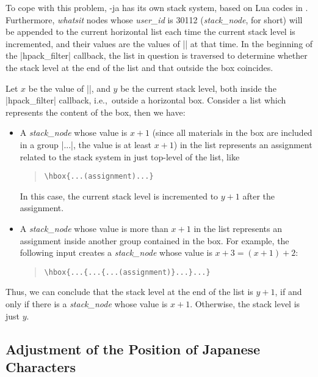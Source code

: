 \documentclass{ajt}
\begin{document}
To cope with this problem, \LuaTeX-ja has its own stack system, based on
Lua codes in \cite{stack-mail}. Furthermore, \emph{whatsit} nodes whose
\emph{user\_id} is 30112 (\emph{stack\_node}, for short) will be
appended to the current horizontal list each time the current stack
level is incremented, and their values are the values of
|\currentgrouplevel| at that time. In the beginning of the |hpack_filter|
callback, the list in question is traversed to determine whether the
stack level at the end of the list and that outside the box coincides.

Let $x$ be the value of |\currentgrouplevel|, and $y$ be the current
stack level, both inside the |hpack_filter| callback, i.e.,~outside a
horizontal box. Consider a list which represents the content of the box,
then we have:
\begin{itemize}
\item A \emph{stack\_node} whose value is $x+1$ (since all materials in
      the box are included in a group |\hbox{...}|, the value is at
      least $x+1$) in the list represents an assignment related to the
      stack system in just top-level of the list, like
\begin{quote}
\begin{verbatim}
\hbox{...(assignment)...}
\end{verbatim}
\end{quote}
In this case, the current stack level is incremented to $y+1$ after the assignment.
\item A \emph{stack\_node} whose value is more than  $x+1$ in the list represents
an assignment inside another group contained in the box. For example,
      the following input creates
a \emph{stack\_node} whose value is $x+3=(x+1)+2$:
\begin{quote}
\begin{verbatim}
\hbox{...{...{...(assignment)}...}...}
\end{verbatim}
\end{quote}
\end{itemize}
Thus, we can conclude that the stack level at the end of the list is
$y+1$, if and only if there is a \emph{stack\_node} whose value is
$x+1$. Otherwise, the stack level is just $y$.

\subsection{Adjustment of the Position of Japanese Characters}
\label{ssec-width}
\end{document}
